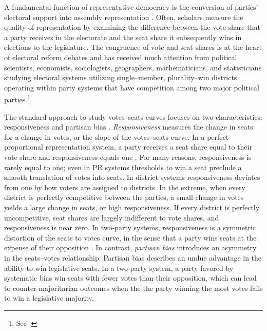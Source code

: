 \documentclass[letter,12pt]{article}
\begin{document}
\noindent A fundamental function of representative democracy is the conversion of parties' electoral support into assembly representation \citep{lijphartElSysPtySys.1994}. Often, scholars measure the quality of representation by examining the difference between the vote share that a party receives in the electorate and the seat share it subsequently wins in elections to the legislature. The congruence of vote and seat shares is at the heart of electoral reform debates and has received much attention from political scientists, economists, sociologists, geographers, mathematicians, and statisticians studying electoral systems utilizing single--member, plurality--win districts operating within party systems that have competition among two major political parties.\footnote{See \citet{altman.mcdonald2011bard,balinskiYoung2001FairRep,brady.grofmanBiasResponsiveness1991,cain.partisanRedistricting.1985,cox.katz.2002,engstrom2006redisttrictApsr,erikson1972malapportionment,gelman.king.1994EvalElSysRedis,grofmanBiasProportionality.1983,grofman.etalBiasMalapp.1997,gudgin.taylor.1980decomposeBias,johnston.2002,kendall.stuartCubeLaw1950,king.browning1987biasRespUS,niemi.fett1986swing,rae.1967,rossiter.etal.1997,taagepera.CubeLaw.1973,trelles.mtz.polygob2012,tufte1973seatsVotes}.\label{fn:cites}}

The standard approach to study votes--seats curves focuses on two characteristics: responsiveness and partisan bias \citep{tufte1973seatsVotes,king.browning1987biasRespUS}. \emph{Responsiveness} measures the change in seats for a change in votes, or the slope of the votes--seats curve. In a perfect proportional representation system, a party receives a seat share equal to their vote share and responsiveness equals one \citep{taagepera.shugart.1989,linzerSeatVoteElasticity2012}. For many reasons, responsiveness is rarely equal to one; even in PR systems thresholds to win a seat preclude a smooth translation of votes into seats. In district systems responsiveness deviates from one by how voters are assigned to districts. In the extreme, when every district is perfectly competitive between the parties, a small change in votes yeilds a large change in seats, or high responsiveness. If every district is perfectly uncompetitive, seat shares are largely indifferent to vote shares, and responsiveness is near zero. In two-party systems, responsiveness is a symmetric distortion of the seats to votes curve, in the sense that a party wins seats at the expense of their opposition \citep{grofman.king.2008.partisansymmetry}. In contrast, \emph{partisan bias} introduces an asymmetry in the seats--votes relationship. Partisan bias describes an undue advantage in the ability to win legislative seats. In a two-party system, a party favored by systematic bias win seats with fewer votes than their opposition, which can lead to counter-majoritarian outcomes when the the party winning the most votes fails to win a legislative majority.
\end{document}
